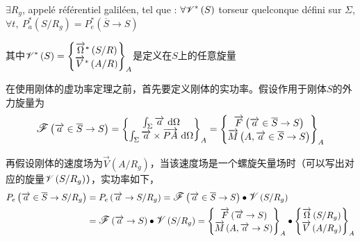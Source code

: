 \documentclass[UTF8]{ctexart}%
\begin{document}
$\exists R_g$, appelé référentiel galiléen, tel que : $\forall \mathlarger{\mathscr{V}}^{\ast}\left(S\right)$ torseur quelconque défini sur $\Sigma$, $\forall t,\ P_a^{\ast}\left(S/R_g\right)=P_e^{\ast}\left(\overline{S}\rightarrow S\right)\label{virtualpowertheoremforasolid}$

其中$\mathlarger{\mathscr{V}}^{\ast}\left(S\right)=\left\{\begin{matrix}
  \overrightarrow{\Omega}^{\ast}\left(S/R\right) \\
  \overrightarrow{V}^{\ast}\left(A/R\right)
 \end{matrix} \right\}_A$是定义在$S$上的任意旋量


在使用刚体的虚功率定理之前，首先要定义刚体的实功率。假设作用于刚体$S$的外力旋量为
\begin{equation}
\mathlarger{\mathscr{F}}\left(\overrightarrow{a}\in \overline{S}\rightarrow S\right)=\left\{\begin{matrix}
  \int_{\Sigma}\overrightarrow{a}\ \mathrm{d}\Omega \\
  \int_{\Sigma}\overrightarrow{a}\times\overrightarrow{PA}\ \mathrm{d}\Omega 
 \end{matrix} \right\}_A=\left\{\begin{matrix}
	\overrightarrow{F}\left(\overrightarrow{a}\in \overline{S}\rightarrow S\right)\\
	\overrightarrow{M}\left(A, \overrightarrow{a}\in \overline{S}\rightarrow S\right)
 \end{matrix} \right\}_A
\end{equation}

再假设刚体的速度场为$\overrightarrow{V}(A/R_g)$，当该速度场是一个螺旋矢量场时（可以写出对应的旋量$\mathlarger{\mathscr{V}}\left(S/R_g\right)$），实功率如下，
\begin{align}
P_e\left(\overrightarrow{a}\in \overline{S}\rightarrow S/R_g\right)&=P_e\left(\overrightarrow{a}\rightarrow S/R_g\right)=\mathlarger{\mathscr{F}}\left(\overrightarrow{a}\in \overline{S}\rightarrow S\right)\bullet \mathlarger{\mathscr{V}}\left(S/R_g\right)\notag \\ &=\mathlarger{\mathscr{F}}\left(\overrightarrow{a} \rightarrow S\right)\bullet \mathlarger{\mathscr{V}}\left(S/R_g\right)=\left\{\begin{matrix}
	\overrightarrow{F}\left(\overrightarrow{a}\rightarrow S\right)\\
	\overrightarrow{M}\left(A, \overrightarrow{a}\rightarrow S\right)
 \end{matrix} \right\}_A \bullet \left\{\begin{matrix}
  \overrightarrow{\Omega}\left(S/R_g\right) \\
  \overrightarrow{V}\left(A/R_g\right)
 \end{matrix} \right\}_A
\end{align}
\end{document}
